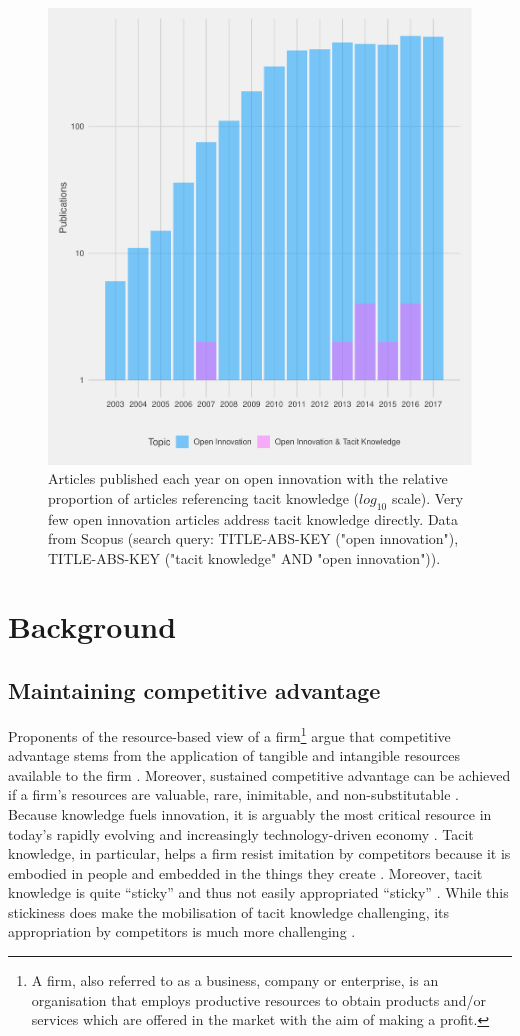 \begin{figure}
    \centering
    \includegraphics[width=0.7\linewidth]{Images/tk_oi.pdf}
    \caption{Articles published each year on open innovation with the relative proportion of articles referencing tacit knowledge ($log_{10}$ scale). Very few open innovation articles address tacit knowledge directly. Data from Scopus (search query: TITLE-ABS-KEY ("open innovation"), TITLE-ABS-KEY ("tacit knowledge"  AND  "open innovation")).}
    \label{fig:biblio}
\end{figure}

\section{Background}

\subsection{Maintaining competitive advantage}

Proponents of the resource-based view of a firm\footnote{A firm, also referred to as a business, company or enterprise, is an organisation that employs productive resources to obtain products and/or services which are offered in the market with the aim of making a profit.} argue that competitive advantage stems from the application of tangible and intangible resources available to the firm \citep{wernerfelt1984resource,peteraf1993cornerstones}. Moreover, sustained competitive advantage can be achieved if a firm's resources are valuable, rare, inimitable, and non\hyp{}substitutable \citep{barney1991firm}. Because knowledge fuels innovation, it is arguably the most critical resource in today's rapidly evolving and increasingly technology\hyp{}driven economy \citep{grant1996toward,urbancova2013competitive}. Tacit knowledge, in particular, helps a firm resist imitation by competitors because it is embodied in people and embedded in the things they create \citep{horvath2000working}. Moreover, tacit knowledge is quite \enquote{sticky} and thus not easily appropriated \enquote{sticky} \citep{szulanski1996exploring}. While this stickiness does make the mobilisation of tacit knowledge challenging, its appropriation by competitors is much more challenging \citep{horvath2000working}. \medskip

